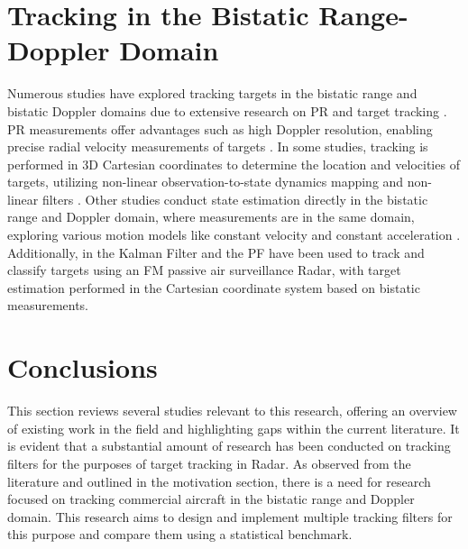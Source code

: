 \section{Tracking in the Bistatic Range-Doppler Domain}

Numerous studies have explored tracking targets in the bistatic range and bistatic Doppler domains due to extensive research on \ac{PR} and target tracking \cite{Measurements2023b,Li2021,Nadjiasngar2012,De2015,Kim2018}. \ac{PR} measurements offer advantages such as high Doppler resolution, enabling precise radial velocity measurements of targets \cite{De2015}. In some studies, tracking is performed in \ac{3D} Cartesian coordinates to determine the location and velocities of targets, utilizing non-linear observation-to-state dynamics mapping and non-linear filters \cite{De2015,Measurements2023b}. Other studies conduct state estimation directly in the bistatic range and Doppler domain, where measurements are in the same domain, exploring various motion models like constant velocity and constant acceleration \cite{Howland2005a,Kim2018,Li2021}. Additionally, in \cite{Herman2002} the Kalman Filter and the \ac{PF} have been used to track and classify targets using an \ac{FM} passive air surveillance \ac{Radar}, with target estimation performed in the Cartesian coordinate system based on bistatic measurements.

\section{Conclusions}
This section reviews several studies relevant to this research, offering an overview of existing work in the field and highlighting gaps within the current literature. It is evident that a substantial amount of research has been conducted on tracking filters for the purposes of target tracking in \ac{Radar}. As observed from the literature and outlined in the motivation section, there is a need for research focused on tracking commercial aircraft in the bistatic range and Doppler domain. This research aims to design and implement multiple tracking filters for this purpose and compare them using a statistical benchmark.

